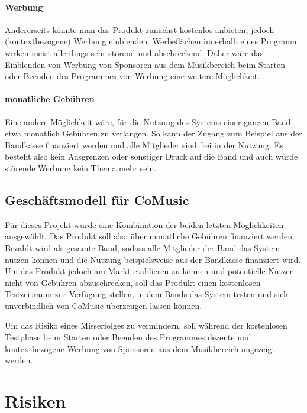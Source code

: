 \documentclass[12pt]{scrartcl}
\begin{document}
\paragraph{Werbung}
Andererseits könnte man das Produkt zunächst kostenlos anbieten, jedoch (kontextbezogene) Werbung einblenden. Werbeflächen innerhalb eines Programm wirken meist allerdings sehr störend und abschreckend. Daher wäre das Einblenden von Werbung von Sponsoren aus dem Musikbereich beim Starten oder Beenden des Programmes von Werbung eine weitere Möglichkeit.

\paragraph{monatliche Gebühren}
Eine andere Möglichkeit wäre, für die Nutzung des Systems einer ganzen Band etwa monatlich Gebühren zu verlangen. So kann der Zugang zum Beispiel aus der Bandkasse finanziert werden und alle Mitglieder sind frei in der Nutzung. Es besteht also kein Ausgrenzen oder sonstiger Druck auf die Band und auch würde  störende Werbung kein Thema mehr sein.

\subsection{Geschäftsmodell für CoMusic}

Für dieses Projekt wurde eine Kombination der beiden letzten Möglichkeiten ausgewählt. Das Produkt soll also über monatliche Gebühren finanziert werden. Bezahlt wird als gesamte Band, sodass alle Mitglieder der Band das System nutzen können und die Nutzung beispielsweise aus der Bandkasse finanziert wird. Um das Produkt jedoch am Markt etablieren zu können und potentielle Nutzer nicht von Gebühren abzuschrecken, soll das Produkt einen kostenlosen Testzeitraum zur Verfügung stellen, in dem Bands das System testen und sich unverbindlich von CoMusic überzeugen lassen können.

Um das Risiko eines Misserfolges zu vermindern, soll während der kostenlosen Testphase beim Starten oder Beenden des Programmes dezente und kontextbezogene Werbung von Sponsoren aus dem Musikbereich angezeigt werden.





\section{Risiken}
\end{document}
